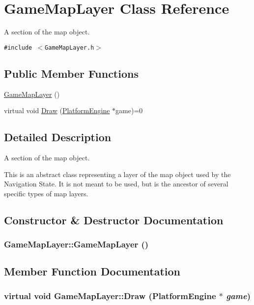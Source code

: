 \hypertarget{class_game_map_layer}{
\section{GameMapLayer Class Reference}
\label{d2/d95/class_game_map_layer}
}
A section of the map object.  


{\tt \#include $<$GameMapLayer.h$>$}

\subsection*{Public Member Functions}
\begin{CompactItemize}
\item 
\hyperlink{class_game_map_layer_92a1d055fbbf7f7c2d974038596b857e}{GameMapLayer} ()
\item 
virtual void \hyperlink{class_game_map_layer_9dee822c9ebe63b636039d06d43a8a32}{Draw} (\hyperlink{class_platform_engine}{PlatformEngine} $\ast$game)=0
\end{CompactItemize}


\subsection{Detailed Description}
A section of the map object. 

This is an abstract class representing a layer of the map object used by the Navigation State. It is not meant to be used, but is the ancestor of several specific types of map layers. 

\subsection{Constructor \& Destructor Documentation}
\hypertarget{class_game_map_layer_92a1d055fbbf7f7c2d974038596b857e}{
\subsubsection[{GameMapLayer}]{\setlength{\rightskip}{0pt plus 5cm}GameMapLayer::GameMapLayer ()}}
\label{d2/d95/class_game_map_layer_92a1d055fbbf7f7c2d974038596b857e}




\subsection{Member Function Documentation}
\hypertarget{class_game_map_layer_9dee822c9ebe63b636039d06d43a8a32}{
\subsubsection[{Draw}]{\setlength{\rightskip}{0pt plus 5cm}virtual void GameMapLayer::Draw ({\bf PlatformEngine} $\ast$ {\em game})}}
\label{d2/d95/class_game_map_layer_9dee822c9ebe63b636039d06d43a8a32}


